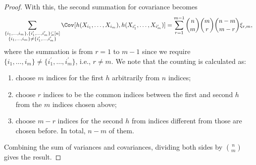 \begin{proof}
	With this, the second summation for covariance becomes
	\[
		\sum_{\substack{\{ i_1, \dots , i_m \} , \{ i_1^{\prime} , \dots , i_m^{\prime} \} \subseteq [n] \\ \{ i_1 , \dots , i_m \} \neq \{ i_1^{\prime} , \dots , i_m^{\prime} \}}} \Cov_{}[h(X_{i_1}, \dots , X_{i_m}) , h(X_{i_1^{\prime} }, \dots , X_{i_m^{\prime} })]
		= \sum_{r=1}^{m-1} \binom{n}{m} \binom{m}{r} \binom{n-m}{m-r} \xi_{r, m},
	\]
	where the summation is from \(r = 1\) to \(m-1\) since we require \(\{ i_1 , \dots , i_m \} \neq \{ i_1^{\prime} , \dots , i_m^{\prime} \}\), i.e., \(r \neq m\). We note that the counting is calculated as:
	\begin{enumerate}
		\item choose \(m\) indices for the first \(h\) arbitrarily from \(n\) indices;
		\item choose \(r\) indices to be the common indices between the first and second \(h\) from the \(m\) indices chosen above;
		\item choose \(m-r\) indices for the second \(h\) from indices different from those are chosen before. In total, \(n-m\) of them.
	\end{enumerate}
	Combining the sum of variances and covariances, dividing both sides by \(\binom{n}{m}\) gives the result.
\end{proof}